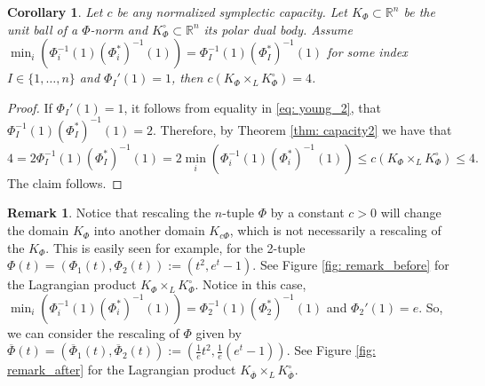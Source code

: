 \documentclass{article}
\newtheorem{cor}{Corollary}[theorem]
\theoremstyle{definition}
\newtheorem{remark}[theorem]{Remark}
\begin{document}
\begin{cor}
Let $c$ be any normalized symplectic capacity. Let $K_{\Phi}\subset \mathbb{R}^n$ be the unit ball of a $\Phi$-norm and $K_{\Phi}^{\circ}\subset \mathbb{R}^n$ its polar dual body. Assume $\min_i(\Phi_i^{-1}(1){(\Phi^*_i)}^{-1}(1))=\Phi_I^{-1}(1){(\Phi^*_I)}^{-1}(1)$ for some index $I\in\{1,\ldots,n\}$ and $\Phi_I'(1)=1$, then $c(K_{\Phi}\times_L K_{\Phi}^{\circ})=4$.
\end{cor}
\begin{proof}
If $\Phi_I'(1)=1$, it follows from equality in \eqref{eq: young_2}, that $\Phi_I^{-1}(1){(\Phi^*_I)}^{-1}(1)=2$. Therefore, by Theorem \ref{thm: capacity2} we have that 
$$4=2\Phi_I^{-1}(1){(\Phi^*_I)}^{-1}(1)=2\min_i(\Phi_i^{-1}(1){(\Phi^*_i)}^{-1}(1))\leq c(K_{\Phi}\times_L K_{\Phi}^{\circ})\leq 4.$$
The claim follows.
\end{proof}

\begin{remark}
Notice that rescaling the $n$-tuple $\Phi$ by a constant $c>0$ will change the domain $K_{\Phi}$ into another domain $K_{c\Phi}$, which is not necessarily a rescaling of the $K_{\Phi}$. This is easily seen for example, for the 2-tuple $\Phi(t)=(\Phi_1(t),\Phi_2(t)):=(t^2,e^t-1)$. See Figure \ref{fig: remark_before} for the Lagrangian product $K_{\Phi}\times_L K_{\Phi}^{\circ}$. Notice in this case, $\min_i(\Phi_i^{-1}(1){(\Phi^*_i)}^{-1}(1))=\Phi_2^{-1}(1){(\Phi^*_2)}^{-1}(1)$ and $\Phi_2'(1)=e$. So, we can consider the rescaling of $\Phi$ given by $\overline{\Phi}(t)=(\overline{\Phi}_1(t),\overline{\Phi}_2(t)):=\left(\frac{1}{e}t^2,\frac{1}{e}(e^t-1)\right)$. See Figure \ref{fig: remark_after} for the Lagrangian product $K_{\overline{\Phi}}\times_L K_{\overline{\Phi}}^{\circ}$.
\end{remark}
\end{document}

